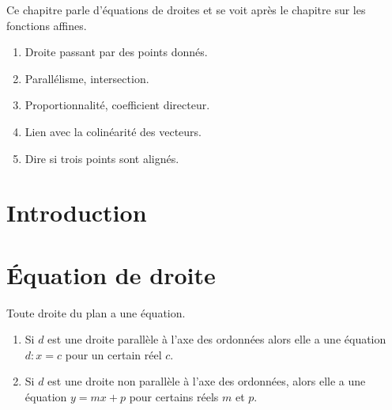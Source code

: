 

Ce chapitre parle d'équations de droites et se voit après le chapitre sur les fonctions affines.
\begin{enumerate}
    \item
        Droite passant par des points donnés.
    \item 
        Parallélisme, intersection.
    \item
        Proportionnalité, coefficient directeur.
    \item
        Lien avec la colinéarité des vecteurs.
    \item
        Dire si trois points sont alignés.
\end{enumerate}

\section*{Introduction}



\section{Équation de droite}

\begin{theorem}
    Toute droite du plan a une équation.
    \begin{enumerate}
        \item
            Si \( d\) est une droite parallèle à l'axe des ordonnées alors elle a une équation \( d:x=c\) pour un certain réel \( c\).
        \item
            Si \( d\) est une droite non parallèle à l'axe des ordonnées, alors elle a une équation \( y=mx+p\) pour certains réels \( m\) et \( p\).
    \end{enumerate}
\end{theorem}

